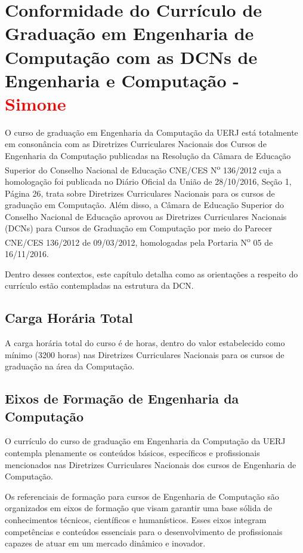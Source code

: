 \chapter{Conformidade do Currículo de Graduação em Engenharia de Computação
  com as DCNs de Engenharia e Computação - \textcolor{red}{Simone}}


O curso de graduação em Engenharia da Computação da UERJ está totalmente em
consonância com as Diretrizes Curriculares Nacionais dos Cursos de Engenharia da Computação publicadas na Resolução da Câmara de Educação Superior do Conselho Nacional de Educação   CNE/CES N\textsuperscript{o}  136/2012 cuja a homologação foi publicada no Diário Oficial da União de 28/10/2016, Seção 1, Página 26, trata sobre Diretrizes Curriculares Nacionais para os cursos de graduação em Computação. Além disso, a Câmara de Educação Superior do Conselho Nacional de Educação aprovou as Diretrizes Curriculares Nacionais (DCNs) para Cursos
de Graduação em Computação por meio do Parecer CNE/CES 136/2012 de 09/03/2012, homologadas pela Portaria N\textsuperscript{o} 05 de 16/11/2016.

Dentro desses contextos, este capítulo detalha como as orientações a respeito do currículo estão contempladas na estrutura da DCN.


\section{Carga Horária Total}

A carga horária total do curso é de \tHorasCurso horas, dentro do valor estabelecido como mínimo (3200 horas) nas Diretrizes Curriculares Nacionais para os cursos de graduação na área da Computação.


\section{Eixos de Formação de Engenharia da Computação}

O currículo do curso de graduação em Engenharia da Computação da UERJ contempla plenamente os conteúdos básicos, específicos e profissionais mencionados nas Diretrizes Curriculares Nacionais dos cursos de Engenharia de Computação.

Os referenciais de formação para cursos de Engenharia de Computação são organizados em eixos de formação que visam garantir uma base sólida de conhecimentos técnicos, científicos e humanísticos. Esses eixos integram competências e conteúdos essenciais para o desenvolvimento de profissionais capazes de atuar em um mercado dinâmico e inovador.

